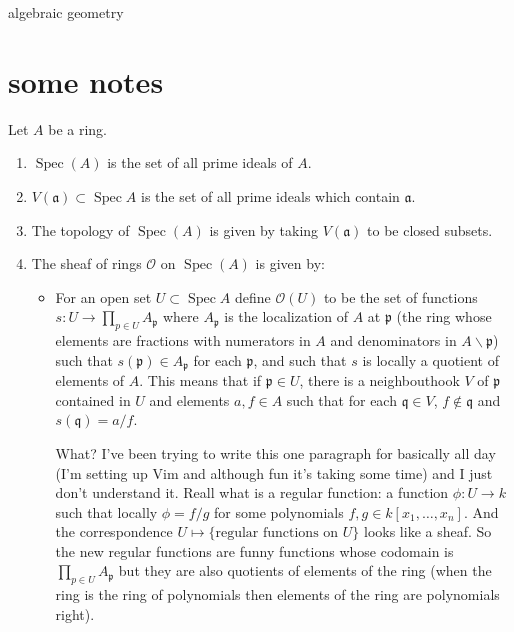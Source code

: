 \documentclass{article}
\newcommand{\Oc}{\mathcal{O}}
\begin{document}
{\Huge algebraic geometry}
\section{some notes}%
\label{sec:some notes}
\begin{defn}[Scheme] Let $A$ be a ring.
	\begin{enumerate}
		\item $\operatorname{Spec}(A)$ is the set of all prime ideals of $A$.
		\item $V(\mathfrak{a})\subset \operatorname{Spec}A$ is the set of all prime ideals which contain $\mathfrak{a}$.
		\item The topology of $\operatorname{Spec}(A)$ is given by taking $V(\mathfrak{a})$ to be closed subsets.
		\item The sheaf of rings $\mathcal{O}$ on $\operatorname{Spec}(A)$ is given by:
			\begin{itemize}
				\item For an open set $U\subset \operatorname{Spec}A$ define $\Oc(U)$ to be the set of functions $s:U\to \prod_{p\in U} A_{\mathfrak{p}}$ where $A_{\mathfrak{p}}$ is the localization of $A$ at $\mathfrak{p}$ (the ring whose elements are fractions with numerators in $A$ and denominators in $A\backslash \mathfrak{p}$) such that $s(\mathfrak{p})\in A_{\mathfrak{p}}$ for each $\mathfrak{p}$, and such that $s$ is locally a quotient of elements of $A$. This means that if $\mathfrak{p}\in U$, there is a neighbouthook $V$ of $\mathfrak{p}$ contained in $U$ and elements $a,f\in A$ such that for each $\mathfrak{q}\in V$, $f\not\in \mathfrak{q}$ and $s\left( \mathfrak{q} \right)=a /f$.

					{\color{cyan}What? I've been trying to write this one paragraph for basically all day (I'm setting up Vim and although fun it's taking some time) and I just don't understand it. Reall what is a regular function: a function $\phi:U\to k$ such that locally $\phi=f /g$ for some polynomials $f,g\in k[x_1,\ldots,x_n]$. And the correspondence $U\mapsto \{\text{regular functions on } U\}$ looks like a sheaf. So the new regular functions are funny functions whose codomain is $\prod_{p\in U}A_{\mathfrak{p}}$ but they are also quotients of elements of the ring (when the ring is the ring of polynomials then elements of the ring are polynomials right).}


\end{itemize}
\end{enumerate}
\end{defn}
\end{document}
